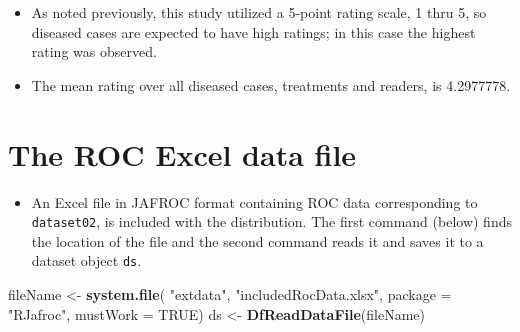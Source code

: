 \documentclass[]{book}
\newenvironment{Shaded}{\begin{snugshade}}{\end{snugshade}}
\newcommand{\CommentTok}[1]{\textcolor[rgb]{0.56,0.35,0.01}{\textit{#1}}}
\newcommand{\DataTypeTok}[1]{\textcolor[rgb]{0.13,0.29,0.53}{#1}}
\newcommand{\DecValTok}[1]{\textcolor[rgb]{0.00,0.00,0.81}{#1}}
\newcommand{\KeywordTok}[1]{\textcolor[rgb]{0.13,0.29,0.53}{\textbf{#1}}}
\newcommand{\NormalTok}[1]{#1}
\newcommand{\OperatorTok}[1]{\textcolor[rgb]{0.81,0.36,0.00}{\textbf{#1}}}
\newcommand{\OtherTok}[1]{\textcolor[rgb]{0.56,0.35,0.01}{#1}}
\newcommand{\StringTok}[1]{\textcolor[rgb]{0.31,0.60,0.02}{#1}}
\providecommand{\tightlist}{%
  \setlength{\itemsep}{0pt}\setlength{\parskip}{0pt}}
\begin{document}
\begin{Shaded}
\end{Shaded}

\begin{itemize}
\tightlist
\item
  As noted previously, this study utilized a 5-point rating scale, 1 thru 5, so diseased cases are expected to have high ratings; in this case the highest rating was observed.
\item
  The mean rating over all diseased cases, treatments and readers, is 4.2977778.
\end{itemize}

\hypertarget{the-roc-excel-data-file}{%
\section{The ROC Excel data file}\label{the-roc-excel-data-file}}

\begin{itemize}
\tightlist
\item
  An Excel file in JAFROC format containing ROC data corresponding to \texttt{dataset02}, is included with the distribution. The first command (below) finds the location of the file and the second command reads it and saves it to a dataset object \texttt{ds}.
\end{itemize}

\begin{Shaded}
\begin{Highlighting}[]
\NormalTok{fileName <-}\StringTok{ }\KeywordTok{system.file}\NormalTok{(}
    \StringTok{"extdata"}\NormalTok{, }\StringTok{"includedRocData.xlsx"}\NormalTok{, }\DataTypeTok{package =} \StringTok{"RJafroc"}\NormalTok{, }\DataTypeTok{mustWork =} \OtherTok{TRUE}\NormalTok{)}
\NormalTok{ds <-}\StringTok{ }\KeywordTok{DfReadDataFile}\NormalTok{(fileName)}
\end{Highlighting}
\end{Shaded}
\end{document}

